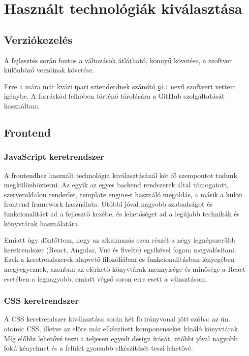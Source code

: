 \chapter{Használt technológiák kiválasztása}

\section{Verziókezelés}

A fejlesztés során fontos a változások átlátható, könnyű követése, a szoftver különböző verzóinak követése.

Erre a mára már kvázi ipari sztenderdnek számító \lstinline|git| nevű szoftvert vettem igénybe. A forráskód felhőben
történő tárolására a GitHub szolgáltatását használtam.

\section{Frontend}
\subsection{JavaScript keretrendszer}
A frontendhez használt technológia kiválasztásánál két fő szempontot tudunk megkülönböztetni.
Az egyik az egyes backend rendszerek által támogatott, szerveroldalon renderlet, template engine-t használó megoldás, a másik a külön frontend framework használata.
Utóbbi jóval nagyobb szabadságot és funkcionalitást ad a fejlesztő kezébe, és lehetőséget ad a legújabb technikák és könyvtárak használatára.

Emiatt úgy döntöttem, hogy az alkalmazás ezen részét a négy legnépszerűbb keretrendszer (React, Angular, Vue és Svelte) egyikével fogom megvalósítani.
Ezek a keretrendszerek alapvető filozófiában és funkcionalitásban lényegében megyegyeznek, azonban az elérhető könyvtárak mennyisége és minősége a React esetében a legnagyobb, emiatt végső soron erre esett a választásom. \cite{React}

\subsection{CSS keretrendszer}
A CSS keretrendszer kiválasztása során két fő irányvonal jött szóba: az ún. atomic CSS, illetve az előre már elkészített komponenseket kínáló könyvtárak.
Míg előbbi lehetővé teszi a teljesen egyedi design írását, utóbbi jóval nagyobb fokú kényelmet és a felület gyorsabb elkészítését teszi lehetővé.

